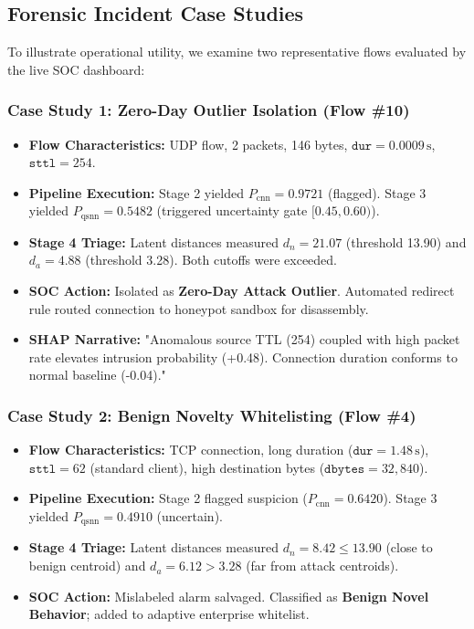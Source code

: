 \documentclass[preprint,12pt]{elsarticle}
\begin{document}
\subsection{Forensic Incident Case Studies}
To illustrate operational utility, we examine two representative flows evaluated by the live SOC dashboard:

\subsubsection{Case Study 1: Zero-Day Outlier Isolation (Flow \#10)}
\begin{itemize}
    \item \textbf{Flow Characteristics:} UDP flow, 2 packets, 146 bytes, $\texttt{dur} = 0.0009\,\text{s}$, $\texttt{sttl} = 254$.
    \item \textbf{Pipeline Execution:} Stage 2 yielded $P_{\text{cnn}} = 0.9721$ (flagged). Stage 3 yielded $P_{\text{qsnn}} = 0.5482$ (triggered uncertainty gate $[0.45, 0.60)$).
    \item \textbf{Stage 4 Triage:} Latent distances measured $d_n = 21.07$ (threshold 13.90) and $d_a = 4.88$ (threshold 3.28). Both cutoffs were exceeded.
    \item \textbf{SOC Action:} Isolated as \textbf{Zero-Day Attack Outlier}. Automated redirect rule routed connection to honeypot sandbox for disassembly.
    \item \textbf{SHAP Narrative:} "Anomalous source TTL (254) coupled with high packet rate elevates intrusion probability (+0.48). Connection duration conforms to normal baseline (-0.04)."
\end{itemize}

\subsubsection{Case Study 2: Benign Novelty Whitelisting (Flow \#4)}
\begin{itemize}
    \item \textbf{Flow Characteristics:} TCP connection, long duration ($\texttt{dur} = 1.48\,\text{s}$), $\texttt{sttl} = 62$ (standard client), high destination bytes ($\texttt{dbytes} = 32,840$).
    \item \textbf{Pipeline Execution:} Stage 2 flagged suspicion ($P_{\text{cnn}} = 0.6420$). Stage 3 yielded $P_{\text{qsnn}} = 0.4910$ (uncertain).
    \item \textbf{Stage 4 Triage:} Latent distances measured $d_n = 8.42 \le 13.90$ (close to benign centroid) and $d_a = 6.12 > 3.28$ (far from attack centroids).
    \item \textbf{SOC Action:} Mislabeled alarm salvaged. Classified as \textbf{Benign Novel Behavior}; added to adaptive enterprise whitelist.
\end{itemize}
\end{document}
